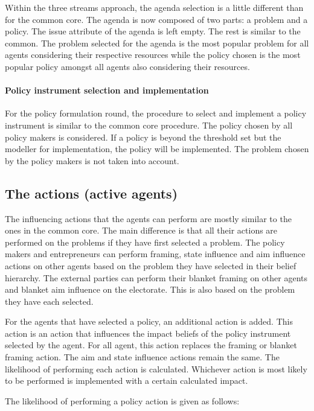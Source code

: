 Within the three streams approach, the agenda selection is a little different than for the common core. The agenda is now composed of two parts: a problem and a policy. The issue attribute of the agenda is left empty. The rest is similar to the common. The problem selected for the agenda is the most popular problem for all agents considering their respective resources while the policy chosen is the most popular policy amongst all agents also considering their resources.

\paragraph{Policy instrument selection and implementation}

For the policy formulation round, the procedure to select and implement a policy instrument is similar to the common core procedure. The policy chosen by all policy makers is considered. If a policy is beyond the threshold set but the modeller for implementation, the policy will be implemented. The problem chosen by the policy makers is not taken into account.

\subsection{The actions (active agents)}

The influencing actions that the agents can perform are mostly similar to the ones in the common core. The main difference is that all their actions are performed on the problems if they have first selected a problem. The policy makers and entrepreneurs can perform framing, state influence and aim influence actions on other agents based on the problem they have selected in their belief hierarchy. The external parties can perform their blanket framing on other agents and blanket aim influence on the electorate. This is also based on the problem they have each selected.

For the agents that have selected a policy, an additional action is added. This action is an action that influences the impact beliefs of the policy instrument selected by the agent. For all agent, this action replaces the framing or blanket framing action. The aim and state influence actions remain the same. The likelihood of performing each action is calculated. Whichever action is most likely to be performed is implemented with a certain calculated impact.

The likelihood of performing a policy action is given as follows:

